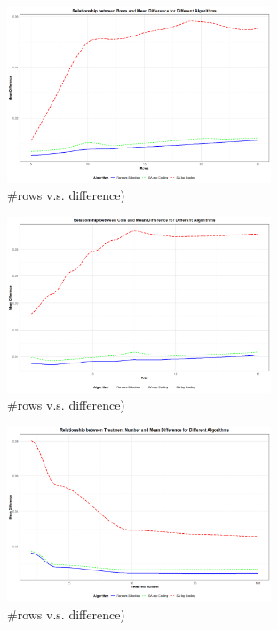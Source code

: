 \documentclass[
  a4paper,
  oneside,
  openany,
  12pt,
  onecolumn]{book}
\theoremstyle{definition}
\theoremstyle{plain}
\theoremstyle{remark}
\begin{document}
\begin{figure}[H]

{\centering \includegraphics[width=0.7\textwidth,height=\textheight]{images/Rplots/means/r-vs-D.png}

}

\caption{\#rows v.s. difference)}

\end{figure}%
\begin{figure}[H]

{\centering \includegraphics[width=0.7\textwidth,height=\textheight]{images/Rplots/means/c-vs-D.png}

}

\caption{\#rows v.s. difference)}

\end{figure}%
\begin{figure}[H]

{\centering \includegraphics[width=0.7\textwidth,height=\textheight]{images/Rplots/means/trt-vs-D.png}

}

\caption{\#rows v.s. difference)}

\end{figure}%
\end{document}
